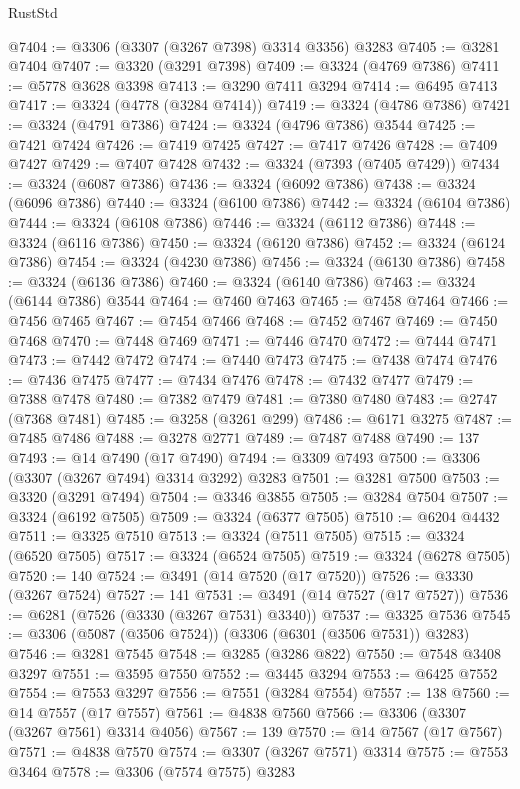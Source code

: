 \begin{lexlean}{RustStd}
\begin{coremodule}
@7404 := @3306 (@3307 (@3267 @7398) @3314 @3356) @3283
@7405 := @3281 @7404
@7407 := @3320 (@3291 @7398)
@7409 := @3324 (@4769 @7386)
@7411 := @5778 @3628 @3398
@7413 := @3290 @7411 @3294
@7414 := @6495 @7413
@7417 := @3324 (@4778 (@3284 @7414))
@7419 := @3324 (@4786 @7386)
@7421 := @3324 (@4791 @7386)
@7424 := @3324 (@4796 @7386) @3544
@7425 := @7421 @7424
@7426 := @7419 @7425
@7427 := @7417 @7426
@7428 := @7409 @7427
@7429 := @7407 @7428
@7432 := @3324 (@7393 (@7405 @7429))
@7434 := @3324 (@6087 @7386)
@7436 := @3324 (@6092 @7386)
@7438 := @3324 (@6096 @7386)
@7440 := @3324 (@6100 @7386)
@7442 := @3324 (@6104 @7386)
@7444 := @3324 (@6108 @7386)
@7446 := @3324 (@6112 @7386)
@7448 := @3324 (@6116 @7386)
@7450 := @3324 (@6120 @7386)
@7452 := @3324 (@6124 @7386)
@7454 := @3324 (@4230 @7386)
@7456 := @3324 (@6130 @7386)
@7458 := @3324 (@6136 @7386)
@7460 := @3324 (@6140 @7386)
@7463 := @3324 (@6144 @7386) @3544
@7464 := @7460 @7463
@7465 := @7458 @7464
@7466 := @7456 @7465
@7467 := @7454 @7466
@7468 := @7452 @7467
@7469 := @7450 @7468
@7470 := @7448 @7469
@7471 := @7446 @7470
@7472 := @7444 @7471
@7473 := @7442 @7472
@7474 := @7440 @7473
@7475 := @7438 @7474
@7476 := @7436 @7475
@7477 := @7434 @7476
@7478 := @7432 @7477
@7479 := @7388 @7478
@7480 := @7382 @7479
@7481 := @7380 @7480
@7483 := @2747 (@7368 @7481)
@7485 := @3258 (@3261 @299)
@7486 := @6171 @3275
@7487 := @7485 @7486
@7488 := @3278 @2771
@7489 := @7487 @7488
@7490 := 137
@7493 := @14 @7490 (@17 @7490)
@7494 := @3309 @7493
@7500 := @3306 (@3307 (@3267 @7494) @3314 @3292) @3283
@7501 := @3281 @7500
@7503 := @3320 (@3291 @7494)
@7504 := @3346 @3855
@7505 := @3284 @7504
@7507 := @3324 (@6192 @7505)
@7509 := @3324 (@6377 @7505)
@7510 := @6204 @4432
@7511 := @3325 @7510
@7513 := @3324 (@7511 @7505)
@7515 := @3324 (@6520 @7505)
@7517 := @3324 (@6524 @7505)
@7519 := @3324 (@6278 @7505)
@7520 := 140
@7524 := @3491 (@14 @7520 (@17 @7520))
@7526 := @3330 (@3267 @7524)
@7527 := 141
@7531 := @3491 (@14 @7527 (@17 @7527))
@7536 := @6281 (@7526 (@3330 (@3267 @7531) @3340))
@7537 := @3325 @7536
@7545 := @3306 (@5087 (@3506 @7524)) (@3306 (@6301 (@3506 @7531)) @3283)
@7546 := @3281 @7545
@7548 := @3285 (@3286 @822)
@7550 := @7548 @3408 @3297
@7551 := @3595 @7550
@7552 := @3445 @3294
@7553 := @6425 @7552
@7554 := @7553 @3297
@7556 := @7551 (@3284 @7554)
@7557 := 138
@7560 := @14 @7557 (@17 @7557)
@7561 := @4838 @7560
@7566 := @3306 (@3307 (@3267 @7561) @3314 @4056)
@7567 := 139
@7570 := @14 @7567 (@17 @7567)
@7571 := @4838 @7570
@7574 := @3307 (@3267 @7571) @3314
@7575 := @7553 @3464
@7578 := @3306 (@7574 @7575) @3283

\end{coremodule}
\end{lexlean}
